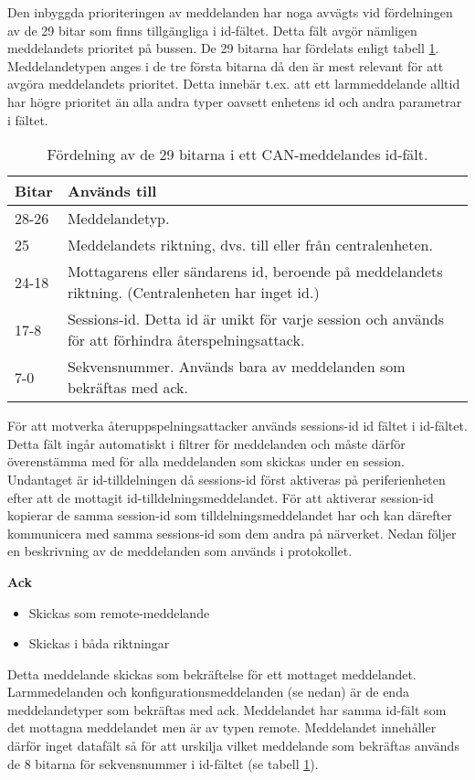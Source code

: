 Den inbyggda prioriteringen av meddelanden har noga avvägts vid fördelningen av de 29 bitar som finns tillgängliga i id-fältet.
Detta fält avgör nämligen meddelandets prioritet på bussen.
De 29 bitarna har fördelats enligt tabell \ref{tab:idbitar}. Meddelandetypen anges i de tre första bitarna då den är mest relevant för att avgöra meddelandets prioritet. Detta innebär t.ex. att ett larmmeddelande alltid har högre prioritet än alla andra typer oavsett enhetens id och andra parametrar i fältet.

\begin{table}[H]
	\centering
	\begin{tabular}{|l|p{}|}
		\hline
		Bitar 	& Används till \\ \hline \hline
		28-26	& Meddelandetyp. \\ \hline
		25		& Meddelandets riktning, dvs. till eller från centralenheten. \\ \hline
		24-18	& Mottagarens eller sändarens id, beroende på meddelandets riktning. (Centralenheten har inget id.) \\ \hline
		17-8 & Sessions-id. Detta id är unikt för varje session och används för att förhindra återspelningsattack. \\ \hline
		7-0 & Sekvensnummer. Används bara av meddelanden som bekräftas med ack. \\ \hline

	\end{tabular}
	\caption{Fördelning av de 29 bitarna i ett CAN-meddelandes id-fält.}
	\label{tab:idbitar}
\end{table}


För att motverka återuppspelningsattacker används sessions-id id fältet i id-fältet. Detta fält ingår automatiskt i filtrer för meddelanden och måste därför överenstämma med för alla meddelanden som skickas under en session. Undantaget är id-tilldelningen då sessions-id först aktiveras på periferienheten efter att de mottagit id-tilldelningsmeddelandet. För att aktiverar session-id kopierar de samma session-id som tilldelningsmeddelandet har och kan därefter kommunicera med samma sessions-id som dem andra på närverket. Nedan följer en beskrivning av de meddelanden som används i protokollet.


\textbf{Ack}
\begin{itemize}
	\item Skickas som remote-meddelande
    \item Skickas i båda riktningar
\end{itemize}
Detta meddelande skickas som bekräftelse för ett mottaget meddelandet. Larmmedelanden och konfigurationsmeddelanden (se nedan) är de enda meddelandetyper som bekräftas med ack. Meddelandet har samma id-fält som det mottagna meddelandet men är av typen remote. Meddelandet innehåller därför inget datafält så för att urskilja vilket meddelande som bekräftas används de 8 bitarna för sekvensnummer i id-fältet (se tabell \ref{tab:idbitar}). \\

